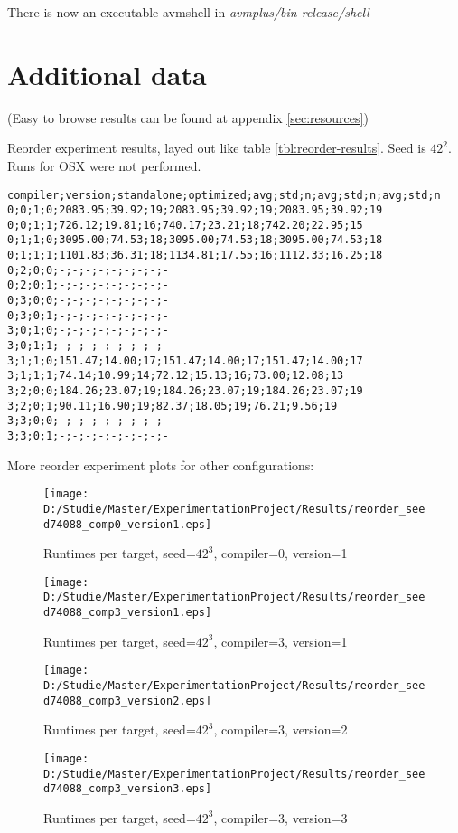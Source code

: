 \documentclass[a4paper,11pt]{scrartcl}
\begin{document}
There is now an executable avmshell in \textit{avmplus/bin-release/shell}

\section{Additional data}
\label{sec:additional-data}

(Easy to browse results can be found at appendix \ref{sec:resources})

Reorder experiment results, layed out like table \ref{tbl:reorder-results}. Seed is $42^2$. Runs for OSX were not performed. 
\begin{verbatim}
compiler;version;standalone;optimized;avg;std;n;avg;std;n;avg;std;n
0;0;1;0;2083.95;39.92;19;2083.95;39.92;19;2083.95;39.92;19
0;0;1;1;726.12;19.81;16;740.17;23.21;18;742.20;22.95;15
0;1;1;0;3095.00;74.53;18;3095.00;74.53;18;3095.00;74.53;18
0;1;1;1;1101.83;36.31;18;1134.81;17.55;16;1112.33;16.25;18
0;2;0;0;-;-;-;-;-;-;-;-;-
0;2;0;1;-;-;-;-;-;-;-;-;-
0;3;0;0;-;-;-;-;-;-;-;-;-
0;3;0;1;-;-;-;-;-;-;-;-;-
3;0;1;0;-;-;-;-;-;-;-;-;-
3;0;1;1;-;-;-;-;-;-;-;-;-
3;1;1;0;151.47;14.00;17;151.47;14.00;17;151.47;14.00;17
3;1;1;1;74.14;10.99;14;72.12;15.13;16;73.00;12.08;13
3;2;0;0;184.26;23.07;19;184.26;23.07;19;184.26;23.07;19
3;2;0;1;90.11;16.90;19;82.37;18.05;19;76.21;9.56;19
3;3;0;0;-;-;-;-;-;-;-;-;-
3;3;0;1;-;-;-;-;-;-;-;-;-
\end{verbatim}

More reorder experiment plots for other configurations:

\begin{figure}[h!]
\centering
\begin{minipage}[b]{0.4\textwidth}
	\texttt{[image: D:/Studie/Master/ExperimentationProject/Results/reorder\_seed74088\_comp0\_version1.eps]}
	\caption{Runtimes per target, seed=$42^3$, compiler=0, version=1}
\end{minipage}
\hfill
\begin{minipage}[b]{0.4\textwidth}
	\texttt{[image: D:/Studie/Master/ExperimentationProject/Results/reorder\_seed74088\_comp3\_version1.eps]}
	\caption{Runtimes per target, seed=$42^3$, compiler=3, version=1}	
\end{minipage}
\end{figure}



\begin{figure}[h!]
\centering
\begin{minipage}[b]{0.4\textwidth}
\texttt{[image: D:/Studie/Master/ExperimentationProject/Results/reorder\_seed74088\_comp3\_version2.eps]}
\caption{Runtimes per target, seed=$42^3$, compiler=3, version=2}
\end{minipage}
\hfill
\begin{minipage}[b]{0.4\textwidth}
\texttt{[image: D:/Studie/Master/ExperimentationProject/Results/reorder\_seed74088\_comp3\_version3.eps]}
\caption{Runtimes per target, seed=$42^3$, compiler=3, version=3}
\end{minipage}
\end{figure}
\end{document}
